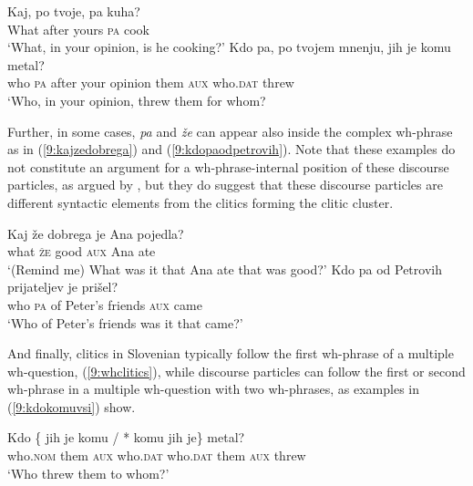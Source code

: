 \documentclass[output=paper,
modfonts,
newtxmath,
hidelinks
]{langscibook}
\begin{document}
\begin{exe}
\ex \label{9:kdopotvojepak} \gll 
 Kaj, po tvoje, pa kuha?\\
	What after yours	 \textsc{pa} cook\\
	\trans `What, in your opinion, is he cooking?'
\ex \label{9:kdopapotvoje}
 \gll Kdo pa, po tvojem mnenju, jih je komu metal?\\
	who \textsc{pa} after your opinion them \textsc{aux} who.\textsc{dat} threw\\
	\trans  `Who, in your opinion, threw them for whom?
\end{exe}

\noindent Further, in some cases, \textit{pa} and \textit{že} can appear also inside the complex wh-phrase as in (\ref{9:kajzedobrega}) and (\ref{9:kdopaodpetrovih}). Note that these examples do not constitute an argument for a wh-phrase-internal position of these discourse particles, as argued by \cite{marusicetal2015}, but they do suggest that these discourse particles are different syntactic elements from the clitics forming the clitic cluster.

\begin{exe}
\ex \label{9:kajzedobrega}
\gll Kaj že dobrega je Ana 	pojedla? \\
 	what \textsc{že} good \textsc{aux} Ana	ate\\
\trans  `(Remind me) What was it that Ana ate that was good?'
\ex \label{9:kdopaodpetrovih}
\gll Kdo pa od Petrovih prijateljev je prišel?\\
 	who \textsc{pa} of Peter's friends \textsc{aux} came\\
\glt  `Who of Peter's friends was it that came?'\\
\hfill\citep[(38)]{marusicetal2015}
\end{exe}

\noindent And finally, clitics in Slovenian typically follow the first wh-phrase of a multiple wh-question, (\ref{9:whclitics}), while discourse particles can follow the first or second wh-phrase in a multiple wh-question with two wh-phrases, as examples in (\ref{9:kdokomuvsi}) show.  

\begin{exe}
\ex  \label{9:whclitics}
 \gll Kdo \{\hspace{-2pt} jih je komu / *\hspace{-2pt} komu jih je\} metal?\\
   who.\textsc{nom} {} them \textsc{aux} who.\textsc{dat} {} {} who.\textsc{dat} them \textsc{aux} threw \\
   \glt `Who threw them to whom?'
\end{exe}
\end{document}
